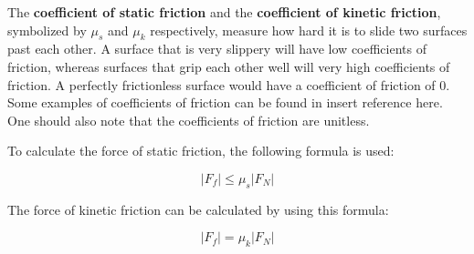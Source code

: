 		The \textbf{coefficient of static friction}  and the \textbf{coefficient of kinetic friction}, symbolized by $\mu_s$ and $\mu_k$ respectively, measure how hard it is to slide two surfaces past each other.  A surface that is very slippery will have low coefficients of friction, whereas surfaces that grip each other well will very high coefficients of friction. A perfectly frictionless surface would have a coefficient of friction of 0.  Some examples of coefficients of friction can be found in \color{red} insert reference here\color{black}.  One should also note that the coefficients of friction are unitless.  
		
		To calculate the force of static friction, the following formula is used:
		\begin{mdframed}[backgroundcolor=orange!20!white]
			\begin{equation}
				|F_f| \leq \mu_s |F_N|  
				\label{eqn:frictionstatic}
			\end{equation}
		\end{mdframed}
	
	The force of kinetic friction can be calculated by using this formula:
			\begin{mdframed}[backgroundcolor=orange!20!white]
		\begin{equation}
			|F_f| = \mu_k |F_N|  
			\label{eqn:frictionkinetic}
		\end{equation}
	\end{mdframed}


